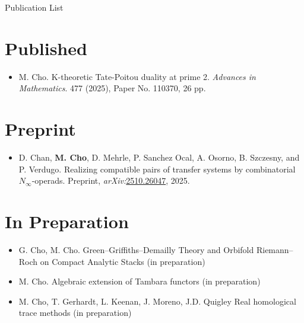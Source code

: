 \documentclass[11pt]{article}
\begin{document}

\begin{center}
\LARGE{Publication List}
\end{center}

\section*{Published}
\begin{itemize}
    \item M. Cho. {K-theoretic Tate-Poitou duality at prime 2}. {\it Advances in Mathematics}. 477 (2025), Paper No. 110370, 26 pp. 
\end{itemize}

\section*{Preprint}
\begin{itemize}
     \item D. Chan, \textbf{M. Cho}, D. Mehrle, P. Sanchez Ocal, A. Osorno, B. Szczesny, and P. Verdugo.
Realizing compatible pairs of transfer systems by combinatorial $N_\infty$-operads.
Preprint, \textit{arXiv:}\href{https://arxiv.org/abs/2510.26047}{2510.26047}, 2025.
\end{itemize}     

\section*{In Preparation}
\begin{itemize}
    \item G. Cho, M. Cho.  Green–Griffiths–Demailly Theory and Orbifold Riemann–Roch on Compact Analytic Stacks (in preparation)


    \item M. Cho.  Algebraic extension of Tambara functors (in preparation)

    \item M. Cho, T. Gerhardt, L. Keenan, J. Moreno, J.D. Quigley Real homological trace methods (in preparation)
\end{itemize}
\end{document}
